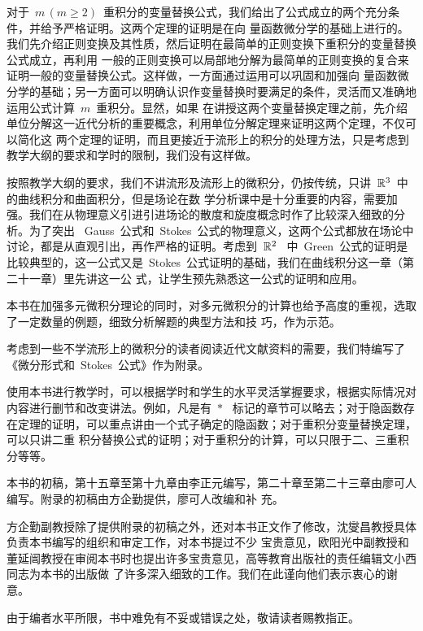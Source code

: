 \begin{preface}
对于~$m\,(m\geq 2)$~重积分的变量替换公式，我们给出了公式成立的两个充分条件，并给予严格证明。这两个定理的证明是在向
量函数微分学的基础上进行的。我们先介绍正则变换及其性质，然后证明在最简单的正则变换下重积分的变量替换公式成立，再利用
一般的正则变换可以局部地分解为最简单的正则变换的复合来证明一般的变量替换公式。这样做，一方面通过运用可以巩固和加强向
量函数微分学的基础；另一方面可以明确认识作变量替换时要满足的条件，灵活而又准确地运用公式计算~$m$~重积分。显然，如果
在讲授这两个变量替换定理之前，先介绍单位分解这一近代分析的重要概念，利用单位分解定理来证明这两个定理，不仅可以简化这
两个定理的证明，而且更接近于流形上的积分的处理方法，只是考虑到教学大纲的要求和学时的限制，我们没有这样做。

按照教学大纲的要求，我们不讲流形及流形上的微积分，仍按传统，只讲~$\mathbb{R}^3$~中的曲线积分和曲面积分，但是场论在数
学分析课中是十分重要的内容，需要加强。我们在从物理意义引进引进场论的散度和旋度概念时作了比较深入细致的分析。为了突出
~Gauss~公式和~Stokes~公式的物理意义，这两个公式都放在场论中讨论，都是从直观引出，再作严格的证明。考虑到~$\mathbb{R}^2$~
中~Green~公式的证明是比较典型的，这一公式又是~Stokes~公式证明的基础，我们在曲线积分这一章（第二十一章）里先讲这一公
式，让学生预先熟悉这一公式的证明和应用。

本书在加强多元微积分理论的同时，对多元微积分的计算也给予高度的重视，选取了一定数量的例题，细致分析解题的典型方法和技
巧，作为示范。

考虑到一些不学流形上的微积分的读者阅读近代文献资料的需要，我们特编写了《微分形式和~Stokes~公式》作为附录。

使用本书进行教学时，可以根据学时和学生的水平灵活掌握要求，根据实际情况对内容进行删节和改变讲法。例如，凡是有~$\ast$~
标记的章节可以略去；对于隐函数存在定理的证明，可以重点讲由一个式子确定的隐函数；对于重积分变量替换定理，可以只讲二重
积分替换公式的证明；对于重积分的计算，可以只限于二、三重积分等等。

本书的初稿，第十五章至第十九章由李正元编写，第二十章至第二十三章由廖可人编写。附录的初稿由方企勤提供，廖可人改编和补
充。

方企勤副教授除了提供附录的初稿之外，还对本书正文作了修改，沈燮昌教授具体负责本书编写的组织和审定工作，对本书提过不少
宝贵意见，欧阳光中副教授和董延闿教授在审阅本书时也提出许多宝贵意见，高等教育出版社的责任编辑文小西同志为本书的出版做
了许多深入细致的工作。我们在此谨向他们表示衷心的谢意。

由于编者水平所限，书中难免有不妥或错误之处，敬请读者赐教指正。
\end{preface}

\endinput
